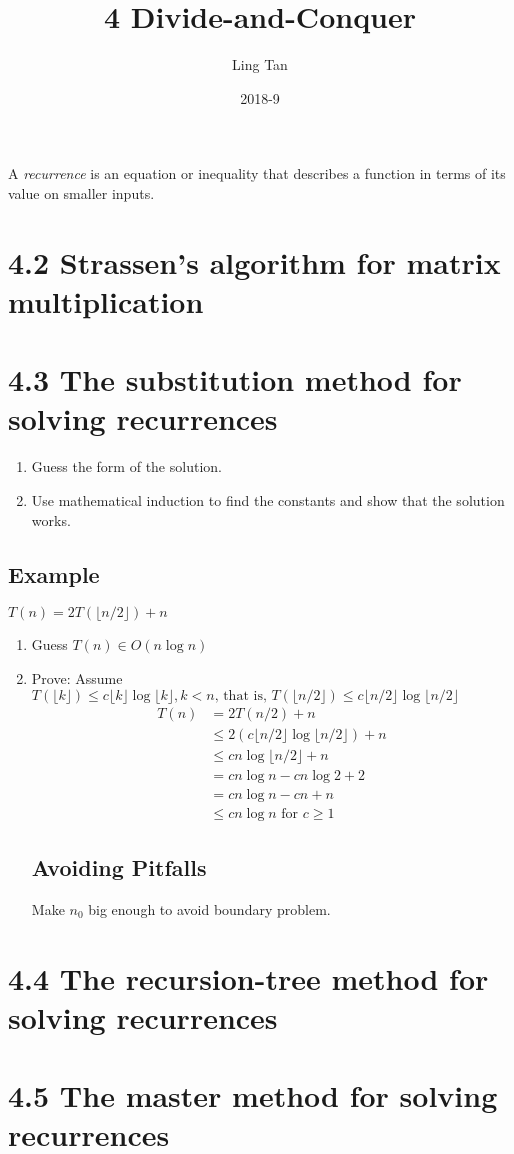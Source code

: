 \documentclass[a4paper]{article}
\title{4 Divide-and-Conquer}
\author{Ling Tan}
\date{2018-9}
\begin{document}
\maketitle
A  \textit{recurrence} is an equation or inequality that describes a function in terms of its value on smaller inputs.
\section*{4.2 Strassen’s algorithm for matrix multiplication}
\section*{4.3 The substitution method for solving recurrences}
\begin{enumerate}
    \item Guess the form of the solution.
    \item Use mathematical induction to find the constants and show that the solution works.
\end{enumerate}
\subsection*{Example}
$T(n)=2T(\lfloor n/2\rfloor)+n$\\
\begin{enumerate}
    \item Guess $T(n)\in O(n \log n)$
    \item Prove: Assume $T(\lfloor{k}\rfloor)\leq c\lfloor{k}\rfloor\log{\lfloor{k}\rfloor}, k< n\text{, that is, }T(\lfloor{n/2}\rfloor)\leq c\lfloor{n/2}\rfloor\log{\lfloor{n/2}\rfloor}$
    \begin{align*}
 T(n) & = 2T(n/2) + n \\
 & \leq 2(c\lfloor{n/2}\rfloor\log{\lfloor{n/2}\rfloor})+n \\ 
 & \leq cn\log{\lfloor{n/2}\rfloor}+n \\
 & = cn \log{n} -cn\log{2}+2\\
 & = cn \log n - cn+n \\
 & \leq cn \log n \text{ for } c\geq 1
 \end{align*}
 \subsection*{Avoiding Pitfalls}
 Make $n_0$ big enough to avoid boundary problem.
\end{enumerate}
\section*{4.4 The recursion-tree method for solving recurrences}
\section*{4.5 The master method for solving recurrences}
\end{document}
